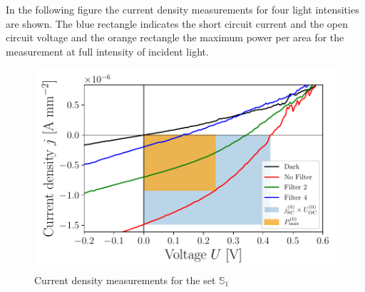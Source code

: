 \documentclass[a4paper,10pt,twocolumn]{article}
\begin{document}
\begin{extract*}

In the following figure the current density measurements for four light intensities are shown. The blue rectangle indicates the short circuit current and the open circuit voltage and the orange rectangle the maximum power per area for the measurement at full intensity of incident light.

\begin{figure}[h]\centering
	\includegraphics[width=\columnwidth]{../../../IV-Curve-Analysis/OSC1Graph.pdf}
	\caption{Current density measurements for the set $\mathbb{S}_1$}
	\label{fig:OSC1Graph}
\end{figure}


\end{extract*}
\end{document}
